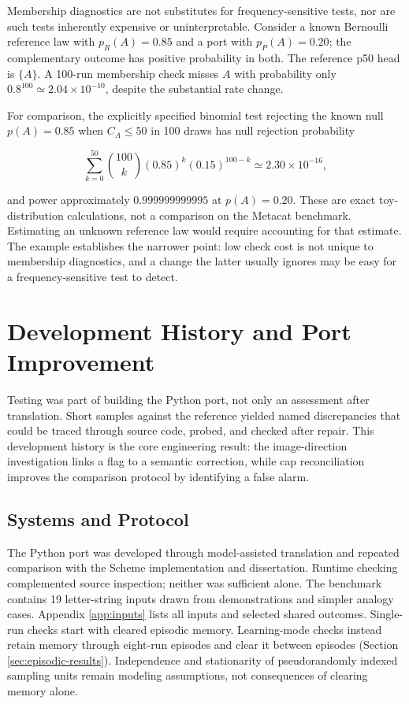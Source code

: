 \documentclass[10pt,letterpaper]{article}
\begin{document}
Membership diagnostics are not substitutes for frequency-sensitive tests, nor are such
tests inherently expensive or uninterpretable. Consider a known Bernoulli reference law
with \(p_R(A)=0.85\) and a port with \(p_P(A)=0.20\); the complementary outcome has
positive probability in both. The reference p50 head is \(\{A\}\). A 100-run membership
check misses \(A\) with probability only \(0.8^{100}\simeq2.04\times10^{-10}\), despite
the substantial rate change.

For comparison, the explicitly specified binomial test rejecting the known null
\(p(A)=0.85\) when \(C_A\le50\) in 100 draws has null rejection probability

\[
\sum_{k=0}^{50}{100\choose k}(0.85)^k(0.15)^{100-k}
\simeq2.30\times10^{-16},
\]

and power approximately \(0.999999999995\) at \(p(A)=0.20\). These are exact
toy-distribution calculations, not a comparison on the Metacat benchmark. Estimating an
unknown reference law would require accounting for that estimate. The example establishes
the narrower point: low check cost is not unique to membership diagnostics, and a change
the latter usually ignores may be easy for a frequency-sensitive test to detect.

\section{Development History and Port Improvement}\label{sec:case}

Testing was part of building the Python port, not only an assessment after translation.
Short samples against the reference yielded named discrepancies that could be traced
through source code, probed, and checked after repair. This development history is the
core engineering result: the image-direction investigation links a flag to a semantic
correction, while cap reconciliation improves the comparison protocol by identifying a
false alarm.

\subsection{Systems and Protocol}\label{sec:protocol}

The Python port was developed through model-assisted translation and repeated comparison
with the Scheme implementation and dissertation. Runtime checking complemented source
inspection; neither was sufficient alone. The benchmark contains 19 letter-string inputs
drawn from demonstrations and simpler analogy cases. Appendix \ref{app:inputs} lists all
inputs and selected shared outcomes. Single-run checks start with cleared episodic memory.
Learning-mode checks instead retain memory through eight-run episodes and clear it between
episodes (Section \ref{sec:episodic-results}). Independence and stationarity of
pseudorandomly indexed sampling units remain modeling assumptions, not consequences of
clearing memory alone.
\end{document}
